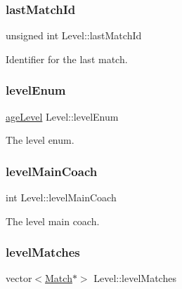 \subsubsection{\texorpdfstring{last\+Match\+Id}{lastMatchId}}
{\footnotesize\ttfamily unsigned int Level\+::last\+Match\+Id\hspace{0.3cm}{\ttfamily [private]}}



Identifier for the last match. 

\hypertarget{class_level_a722b6532d70a38fa5f31518761c63012}{}\label{class_level_a722b6532d70a38fa5f31518761c63012} 
\subsubsection{\texorpdfstring{level\+Enum}{levelEnum}}
{\footnotesize\ttfamily \hyperlink{_utils_8hpp_a226b190c54f09ab6ba8ac83b28e3c4b6}{age\+Level} Level\+::level\+Enum\hspace{0.3cm}{\ttfamily [private]}}



The level enum. 

\hypertarget{class_level_af7943487f1cf311dfa00400037da1f3d}{}\label{class_level_af7943487f1cf311dfa00400037da1f3d} 
\subsubsection{\texorpdfstring{level\+Main\+Coach}{levelMainCoach}}
{\footnotesize\ttfamily int Level\+::level\+Main\+Coach\hspace{0.3cm}{\ttfamily [private]}}



The level main coach. 

\hypertarget{class_level_ace54062d1ad170581337f33ac4d6ab45}{}\label{class_level_ace54062d1ad170581337f33ac4d6ab45} 
\subsubsection{\texorpdfstring{level\+Matches}{levelMatches}}
{\footnotesize\ttfamily vector$<$\hyperlink{class_match}{Match}$\ast$$>$ Level\+::level\+Matches\hspace{0.3cm}{\ttfamily [private]}}



